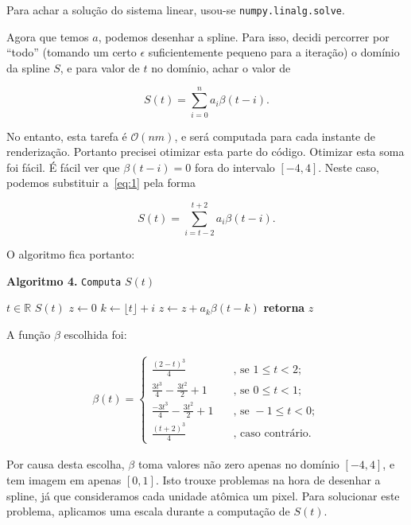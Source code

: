 \documentclass[12pt]{article}
\theoremstyle{plain}
\numberwithin{equation}{section}
\newcommand{\bigo}{\mathcal{O}}
\newcommand{\code}[1]{\lstinline[mathescape=true]{#1}}
\begin{document}
Para achar a solução do sistema linear, usou-se \code{numpy.linalg.solve}.

Agora que temos $a$, podemos desenhar a spline. Para isso, decidi percorrer por ``todo'' (tomando
um certo $\epsilon$ suficientemente pequeno para a iteração) o domínio da spline $S$, e para valor
de $t$ no domínio, achar o valor de

\begin{equation}
  S(t)=\sum_{i=0}^n a_i\beta(t-i).\label{eq:1}
\end{equation}

No entanto, esta tarefa é $\bigo(nm)$, e será computada para cada instante de renderização.
Portanto precisei otimizar esta parte do código. Otimizar esta soma foi fácil. É fácil ver que
$\beta(t-i)=0$ fora do intervalo $[-4,4]$. Neste caso, podemos substituir a~\autoref{eq:1} pela
forma

\begin{equation*}
  S(t)=\sum_{i=t-2}^{t+2} a_i\beta(t-i).
\end{equation*}

O algoritmo fica portanto:

\begin{algorithm}[h]
  \caption*{\textbf{Algoritmo 4.} \code{Computa} $S(t)$}
  \begin{algorithmic}[1]
    \Require $t\in\mathbb{R}$
    \Ensure $S(t)$
    \State $z\gets 0$
      \State $k\gets\lfloor t\rfloor+i$
        \State $z\gets z+a_k\beta(t-k)$
      \EndIf%
    \EndFor%
    \State\textbf{retorna} $z$
  \end{algorithmic}
\end{algorithm}

A função $\beta$ escolhida foi:

\begin{align*}
  \beta(t)=\begin{cases}
    \frac{(2-t)^3}{4} & \quad \text{, se }1\leq t<2;\\
    \frac{3t^3}{4}-\frac{3t^2}{2}+1 & \quad \text{, se }0\leq t<1;\\
    \frac{-3t^3}{4}-\frac{3t^2}{2}+1 & \quad \text{, se }-1\leq t<0;\\
    \frac{(t+2)^3}{4} & \quad \text{, caso contrário.}
  \end{cases}
\end{align*}

Por causa desta escolha, $\beta$ toma valores não zero apenas no domínio $[-4,4]$, e tem imagem em
apenas $[0,1]$. Isto trouxe problemas na hora de desenhar a spline, já que consideramos cada
unidade atômica um pixel. Para solucionar este problema, aplicamos uma escala durante a computação
de $S(t)$.
\end{document}
